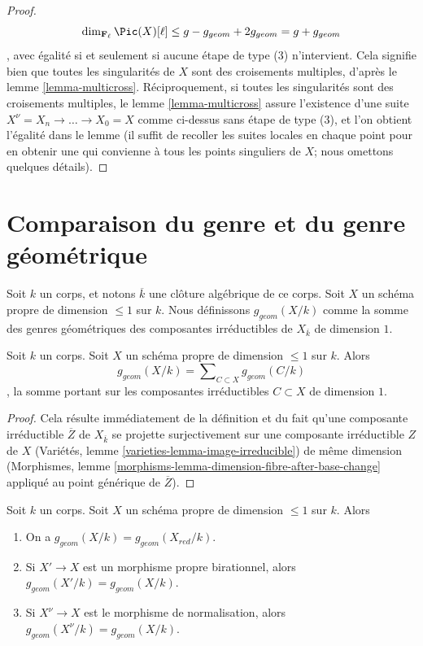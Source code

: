 \begin{proof}
$$\dim_{\mathbf{F}_\ell} \Pic(X)[\ell] \leq
g - g_{geom} + 2g_{geom} = g + g_{geom}
$$, avec égalité si et seulement si aucune étape de type (3) n'intervient. Cela signifie bien que toutes les singularités de $X$ sont des croisements multiples, d'après le lemme \ref{lemma-multicross}. Réciproquement, si toutes les singularités sont des croisements multiples, le lemme \ref{lemma-multicross} assure l'existence d'une suite $X^\nu = X_n \to \ldots \to X_0 = X$ comme ci-dessus sans étape de type (3), et l'on obtient l'égalité dans le lemme (il suffit de recoller les suites locales en chaque point pour en obtenir une qui convienne à tous les points singuliers de $X$; nous omettons quelques détails).
\end{proof}





\section{Comparaison du genre et du genre géométrique}
\label{section-genus-geometric-genus}

\noindent
Soit $k$ un corps, et notons $\overline{k}$ une clôture algébrique de ce corps. Soit $X$ un schéma propre de dimension $\leq 1$ sur $k$. Nous définissons $g_{geom}(X/k)$ comme la somme des genres géométriques des composantes irréductibles de $X_{\overline{k}}$ de dimension $1$.

\begin{lemma}
\label{lemma-bound-geometric-genus}
Soit $k$ un corps. Soit $X$ un schéma propre de dimension $\leq 1$ sur $k$. Alors $$
g_{geom}(X/k) = \sum\nolimits_{C \subset X} g_{geom}(C/k)
$$, la somme portant sur les composantes irréductibles $C \subset X$ de dimension $1$.
\end{lemma}

\begin{proof}
Cela résulte immédiatement de la définition et du fait qu'une composante irréductible $\overline{Z}$ de $X_{\overline{k}}$ se projette surjectivement sur une composante irréductible $Z$ de $X$ (Variétés, lemme \ref{varieties-lemma-image-irreducible}) de même dimension (Morphismes, lemme \ref{morphisms-lemma-dimension-fibre-after-base-change} appliqué au point générique de $\overline{Z}$).
\end{proof}

\begin{lemma}
\label{lemma-geometric-genus-normalization}
Soit $k$ un corps. Soit $X$ un schéma propre de dimension $\leq 1$ sur $k$. Alors \begin{enumerate} \item On a $g_{geom}(X/k) = g_{geom}(X_{red}/k)$. \item Si $X' \to X$ est un morphisme propre birationnel, alors $g_{geom}(X'/k) = g_{geom}(X/k)$. \item Si $X^\nu \to X$ est le morphisme de normalisation, alors $g_{geom}(X^\nu/k) = g_{geom}(X/k)$.
\end{enumerate}
\end{lemma}

